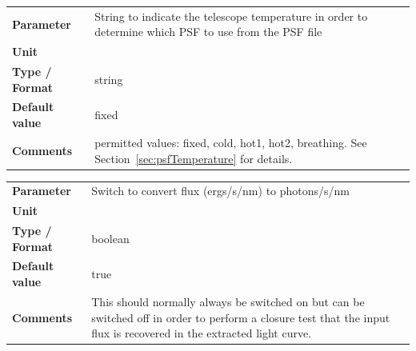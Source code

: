 \documentclass[11pt]{article}      %
\def\HCode#1{}
\def\htmlanchor#1{\HCode{<a id="#1"></a>}}
\begin{document}
\begin{table}[hb]
  \htmlanchor{thermalMap}
  \begin{tabular}{| l | p{13cm} |}
    \hline 
    {\bf Parameter} & String to indicate the telescope temperature in order to determine which PSF to use from the PSF file\\
    {\bf Unit} & \\
    {\bf Type / Format} & string\\
    {\bf Default value} & fixed\\
    {\bf Comments} & permitted values: fixed, cold, hot1, hot2, breathing. See Section~\ref{sec:psfTemperature} for details.\\
    \hline
  \end{tabular}
  \bigskip

  \htmlanchor{convertFluxToPhotons}
  \begin{tabular}{| l | p{13cm} |}
    \hline 
    {\bf Parameter} & Switch to convert flux (ergs/s/nm) to photons/s/nm\\
    {\bf Unit} & \\
    {\bf Type / Format} & boolean\\
    {\bf Default value} & true\\
    {\bf Comments} & This should normally always be switched on but can be switched off in order to perform a closure test that the input flux is recovered in the extracted light curve.\\
    \hline
  \end{tabular}
  \bigskip

  \label{tab:psfgen}
\end{table}
\end{document}
